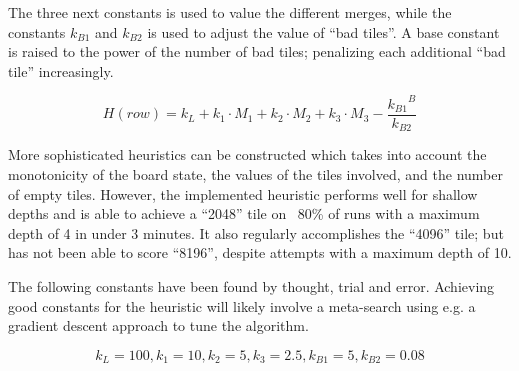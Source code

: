 The three next constants is used to value the different merges, while the constants $k_{B1}$ and $k_{B2}$ is used to adjust the value of ``bad tiles''. A base constant is raised to the power of the number of bad tiles; penalizing each additional ``bad tile'' increasingly.

\begin{displaymath}
H(\textit{row}) = k_L + k_1 \cdot M_1 + k_2 \cdot M_2 + k_3 \cdot M_3 - \frac{{k_{B1}}^{B}}{k_{B2}}
\end{displaymath}

More sophisticated heuristics can be constructed which takes into account the monotonicity of the board state, the values of the tiles involved, and the number of empty tiles. However, the implemented heuristic performs well for shallow depths and is able to achieve a ``2048'' tile on ~80\% of runs with a maximum depth of 4 in under 3 minutes. It also regularly accomplishes the ``4096'' tile; but has not been able to score ``8196'', despite attempts with a maximum depth of 10.

The following constants have been found by thought, trial and error. Achieving good constants for the heuristic will likely involve a meta-search using e.g. a gradient descent approach to tune the algorithm.

\begin{displaymath}
k_L = 100, k_1 = 10, k_2 = 5, k_3 = 2.5, k_{B1} = 5, k_{B2} = 0.08
\end{displaymath}



